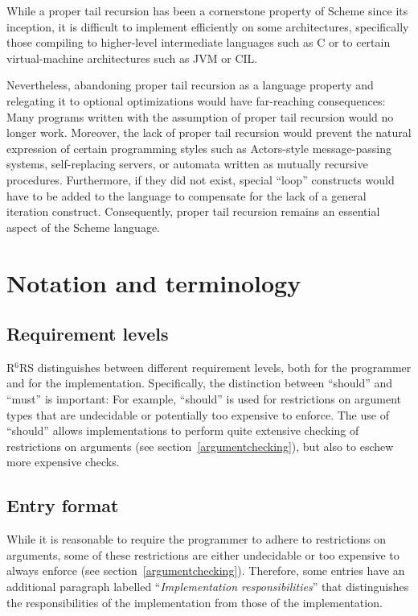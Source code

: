\documentclass[twoside,twocolumn]{algol60}
\newcommand{\rn}[1]{R$^{#1}$RS}
\begin{document}
While a proper tail recursion has been a cornerstone property of
Scheme since its inception, it is difficult to implement efficiently
on some architectures, specifically those compiling to higher-level
intermediate languages such as C or to certain virtual-machine
architectures such as JVM or CIL.

Nevertheless, abandoning proper tail recursion as a language property
and relegating it to optional optimizations would have far-reaching
consequences: Many programs written with the assumption of proper tail
recursion would no longer work.  Moreover, the lack of proper tail
recursion would prevent the natural expression of certain programming
styles such as Actors-style message-passing systems, self-replacing
servers, or automata written as mutually recursive procedures.
Furthermore, if they did not exist, special ``loop'' constructs would
have to be added to the language to compensate for the lack of a general
iteration construct.  Consequently, proper tail recursion remains an
essential aspect of the Scheme language.

\chapter{Notation and terminology}

\section{Requirement levels}

\rn{6} distinguishes between different requirement levels, both for
the programmer and for the implementation.  Specifically, the
distinction between ``should'' and ``must'' is important: For example,
``should'' is used for restrictions on argument types that are
undecidable or potentially too expensive to enforce.  The use of
``should'' allows implementations to perform quite extensive checking
of restrictions on arguments (see section~\ref{argumentchecking}), but
also to eschew more expensive checks.

\section{Entry format}

While it is reasonable to require the programmer to adhere to
restrictions on arguments, some of these restrictions are either
undecidable or too expensive to always enforce (see
section~\ref{argumentchecking}).  Therefore, some entries have
an additional paragraph labelled ``\textit{Implementation
  responsibilities}'' that distinguishes the responsibilities of the
implementation from those of the implementation.
\end{document}
